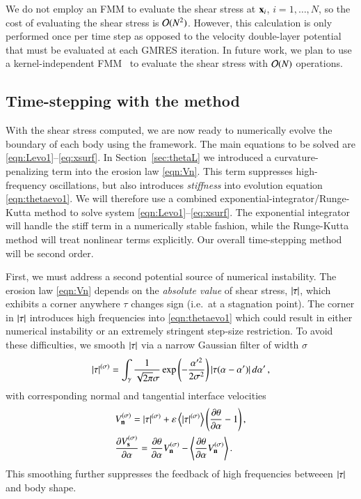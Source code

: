 \documentclass[preprint, 10pt]{elsarticle}
\begin{document}
We do not employ an FMM to evaluate the shear stress at ${\mathbf{x}}_i$,
$i=1,\ldots,N$, so the cost of evaluating the shear stress is
${\mathcal{O}}(N^2)$.  However, this calculation is only performed once per time
step as opposed to the velocity double-layer potential that must be
evaluated at each GMRES iteration.  In future work, we plan to use a
kernel-independent FMM~\cite{yin-bir-zor2004} to evaluate the shear
stress with ${\mathcal{O}}(N)$ operations.

\subsection{Time-stepping with the {\thL} method} 
\label{sec:timeStepping}

With the shear stress computed, we are now ready to numerically evolve the boundary of each body using the {\thL} framework. The main equations to be solved are \eqref{eqn:Levo1}--\eqref{eq:xsurf}.  In Section~\ref{sec:thetaL} we introduced a curvature-penalizing term into the erosion law \eqref{eqn:Vn}. This term suppresses high-frequency oscillations, but also introduces {\em stiffness} into evolution equation \eqref{eqn:thetaevo1}. We will therefore use a combined exponential-integrator/Runge-Kutta method to solve system \eqref{eqn:Levo1}--\eqref{eq:xsurf}. The exponential integrator will handle the stiff term in a numerically stable fashion, while the Runge-Kutta method will treat nonlinear terms explicitly. Our overall time-stepping method will be second order.

First, we must address a second potential source of numerical instability. The erosion law \eqref{eqn:Vn} depends on the {\em absolute value} of shear stress, $\lvert \tau \rvert$, which exhibits a corner anywhere $\tau$ changes sign (i.e.~at a stagnation point). The corner in $\lvert \tau \rvert$ introduces high frequencies into \eqref{eqn:thetaevo1} which could result in either numerical instability or an extremely stringent step-size restriction. To avoid these difficulties, we smooth $\lvert \tau \rvert$ via a narrow Gaussian filter of width $\sigma$
\begin{align}
\lvert \tau \rvert^{(\sigma)} = \int_{\gamma} \frac{1}{\sqrt{2\pi} \sigma}
 \exp \left(- \frac{\alpha'^2}{2 \sigma^2}\right) \lvert  \tau(\alpha - \alpha')  \rvert \, d\alpha' \, ,
\end{align}
with corresponding normal and tangential interface velocities
\begin{align}
& V_{\mathbf{n}}^{(\sigma)} = \lvert \tau \rvert^{(\sigma)} +  \varepsilon \left< \lvert \tau \rvert^{(\sigma)} \right>
\left(\frac{\partial \theta}{\partial \alpha} - 1 \right), \\
& \frac{\partial V_{\mathbf{s}}^{(\sigma)}}{\partial \alpha} = \frac{\partial \theta}{\partial \alpha} V_{\mathbf{n}}^{(\sigma)} - \left< \frac{\partial \theta}{\partial \alpha} V_{\mathbf{n}}^{(\sigma)} \right>.
\end{align}
This smoothing further suppresses the feedback of high frequencies betweeen $\lvert \tau \rvert$ and body shape.
\end{document}
